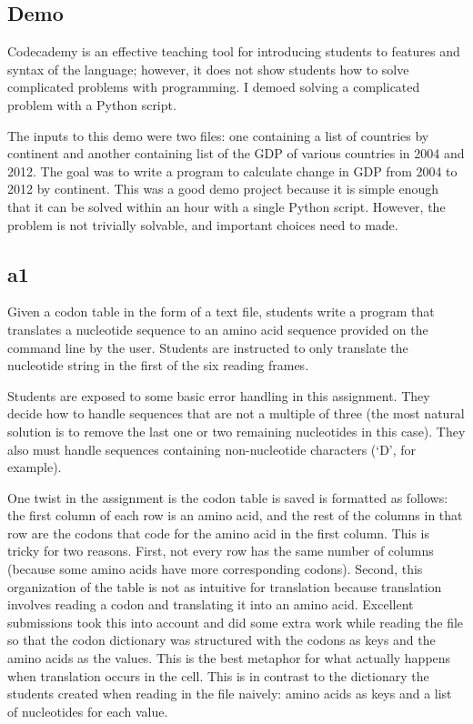 \documentclass{report}
\begin{document}
\subsection{Demo}
Codecademy is an effective teaching tool for introducing students to features and syntax of the language; however, it does not show students how to solve complicated problems with programming. I demoed solving a complicated problem with a Python script.

The inputs to this demo were two files: one containing a list of countries by continent and another containing list of the GDP of various countries in 2004 and 2012. The goal was to write a program to calculate change in GDP from 2004 to 2012 by continent. This was a good demo project because it is simple enough that it can be solved within an hour with a single Python script. However, the problem is not trivially solvable, and important choices need to made.

\subsection{a1}
Given a codon table in the form of a text file, students write a program that translates a nucleotide sequence to an amino acid sequence provided on the command line by the user. Students are instructed to only translate the nucleotide string in the first of the six reading frames.

Students are exposed to some basic error handling in this assignment. They decide how to handle sequences that are not a multiple of three (the most natural solution is to remove the last one or two remaining nucleotides in this case). They also must handle sequences containing non-nucleotide characters (`D', for example).

One twist in the assignment is the codon table is saved is formatted as follows: the first column of each row is an amino acid, and the rest of the columns in that row are the codons that code for the amino acid in the first column. This is tricky for two reasons. First, not every row has the same number of columns (because some amino acids have more corresponding codons). Second, this organization of the table is not as intuitive for translation because translation involves reading a codon and translating it into an amino acid. Excellent submissions took this into account and did some extra work while reading the file so that the codon dictionary was structured with the codons as keys and the amino acids as the values. This is the best metaphor for what actually happens when translation occurs in the cell. This is in contrast to the dictionary the students created when reading in the file naively: amino acids as keys and a list of nucleotides for each value.
\end{document}
